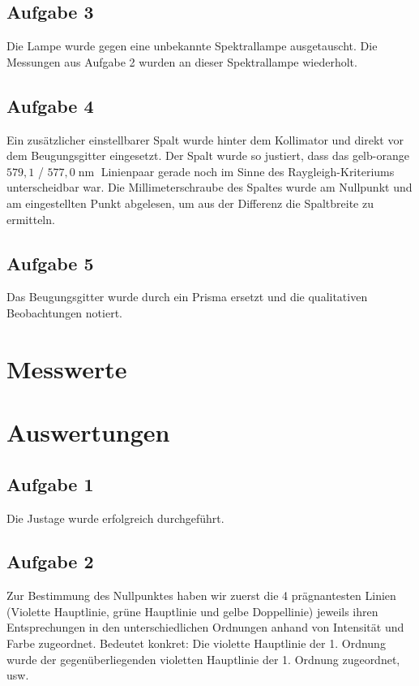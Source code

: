 \documentclass[a4paper,german,12pt,smallheadings]{scrartcl}
\begin{document}
\subsection{Aufgabe 3}

Die Lampe wurde gegen eine unbekannte Spektrallampe ausgetauscht. Die Messungen
aus Aufgabe 2 wurden an dieser Spektrallampe wiederholt.

\subsection{Aufgabe 4}

Ein zusätzlicher einstellbarer Spalt wurde hinter dem Kollimator und direkt vor
dem Beugungsgitter eingesetzt. Der Spalt wurde so justiert, dass das
gelb-orange $579{,}1$ / $577{,}0 \operatorname{nm}$ Linienpaar gerade noch im Sinne
des Raygleigh-Kriteriums unterscheidbar war. Die Millimeterschraube des Spaltes
wurde am Nullpunkt und am eingestellten Punkt abgelesen, um aus der Differenz
die Spaltbreite zu ermitteln.

\subsection{Aufgabe 5}

Das Beugungsgitter wurde durch ein Prisma ersetzt und die qualitativen
Beobachtungen notiert.
\newpage
\section{Messwerte}
\newpage
\section{Auswertungen}
\subsection{Aufgabe 1}

Die Justage wurde erfolgreich durchgeführt.

\subsection{Aufgabe 2}
Zur Bestimmung des Nullpunktes haben wir zuerst die 4 prägnantesten Linien
(Violette Hauptlinie, grüne Hauptlinie und gelbe Doppellinie) jeweils ihren
Entsprechungen in den unterschiedlichen Ordnungen anhand von Intensität und
Farbe zugeordnet. Bedeutet konkret: Die violette Hauptlinie der 1. Ordnung
wurde der gegenüberliegenden violetten Hauptlinie der 1. Ordnung zugeordnet,
usw.
\end{document}
